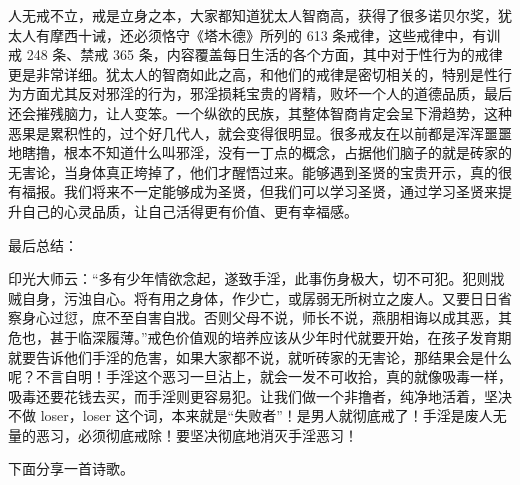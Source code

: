 人无戒不立，戒是立身之本，大家都知道犹太人智商高，获得了很多诺贝尔奖，犹太人有摩西十诫，还必须恪守《塔木德》所列的 613 条戒律，这些戒律中，有训戒 248 条、禁戒 365 条，内容覆盖每日生活的各个方面，其中对于性行为的戒律更是非常详细。犹太人的智商如此之高，和他们的戒律是密切相关的，特别是性行为方面尤其反对邪淫的行为，邪淫损耗宝贵的肾精，败坏一个人的道德品质，最后还会摧残脑力，让人变笨。一个纵欲的民族，其整体智商肯定会呈下滑趋势，这种恶果是累积性的，过个好几代人，就会变得很明显。很多戒友在以前都是浑浑噩噩地瞎撸，根本不知道什么叫邪淫，没有一丁点的概念，占据他们脑子的就是砖家的无害论，当身体真正垮掉了，他们才醒悟过来。能够遇到圣贤的宝贵开示，真的很有福报。我们将来不一定能够成为圣贤，但我们可以学习圣贤，通过学习圣贤来提升自己的心灵品质，让自己活得更有价值、更有幸福感。

最后总结：

印光大师云：“多有少年情欲念起，遂致手淫，此事伤身极大，切不可犯。犯则戕贼自身，污浊自心。将有用之身体，作少亡，或孱弱无所树立之废人。又要日日省察身心过愆，庶不至自害自戕。否则父母不说，师长不说，燕朋相诲以成其恶，其危也，甚于临深履薄。”戒色价值观的培养应该从少年时代就要开始，在孩子发育期就要告诉他们手淫的危害，如果大家都不说，就听砖家的无害论，那结果会是什么呢？不言自明！手淫这个恶习一旦沾上，就会一发不可收拾，真的就像吸毒一样，吸毒还要花钱去买，而手淫则更容易犯。让我们做一个非撸者，纯净地活着，坚决不做 loser，loser 这个词，本来就是“失败者”！是男人就彻底戒了！手淫是废人无量的恶习，必须彻底戒除！要坚决彻底地消灭手淫恶习！

下面分享一首诗歌。

